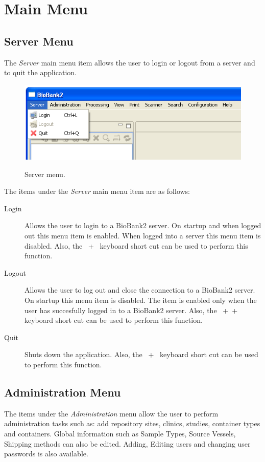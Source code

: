 \clearpage
\section{Main Menu}
\label{sec:main_menu}

\subsection{Server Menu}
The \emph{Server} main menu item allows the user to login or logout from a
server and to quit the application.
\begin{figure}[H]
  \centering
  \scalebox{0.5}
	   { \includegraphics*{screenshots/overview/main_menu_server} }
	   \caption{Server menu.}
	   \label{fig:main_menu_server}
\end{figure}
The items under the \emph{Server} main menu item are as follows:
\begin{description}
\item[Login] Allows the user to login to a BioBank2 server. On startup and
  when logged out this menu item is enabled. When logged into a server this
  menu item is disabled. Also, the \mbox{ + } keyboard
  short cut can be used to perform this function.
\item[Logout] Allows the user to log out and close the connection to a
  BioBank2 server. On startup this menu item is disabled. The item is enabled
  only when the user has succesfully logged in to a BioBank2 server. Also,
  the \mbox{ +  + } keyboard short cut can be
  used to perform this function.
\item[Quit] Shuts down the application. Also, the \mbox{ +
  } keyboard short cut can be used to perform this function.
\end{description}
\clearpage

\subsection{Administration Menu}
The items under the \emph{Administration} menu allow the user to perform
administration tasks such as: add repository sites, clinics, studies, container
types and containers. Global information such as Sample Types, Source Vessels,
Shipping methods can also be edited. Adding, Editing users and changing user
passwords is also available.


